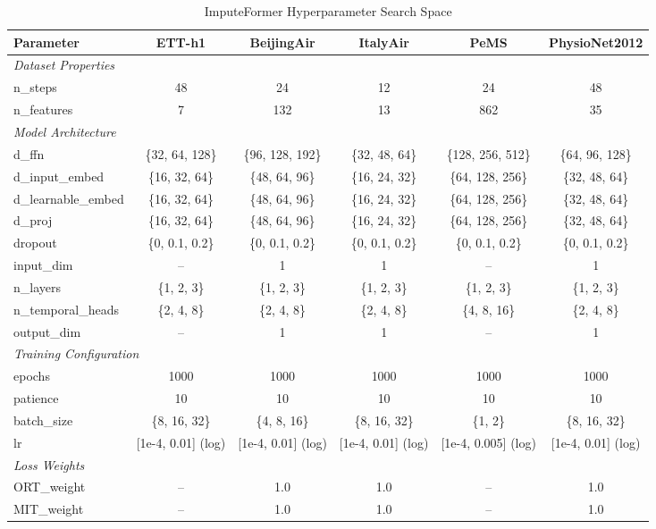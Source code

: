 \begin{table}[H]
\centering
\caption{ImputeFormer Hyperparameter Search Space}
\label{tab:hyperparam_imputeformer}
\begin{adjustbox}{max width=\textwidth}
\begin{small}
\begin{tabular}{l|ccccc}
\toprule
\textbf{Parameter} & \textbf{ETT-h1} & \textbf{BeijingAir} & \textbf{ItalyAir} & \textbf{PeMS} & \textbf{PhysioNet2012} \\
\midrule
\multicolumn{6}{l}{\textit{Dataset Properties}} \\
n\_steps & 48 & 24 & 12 & 24 & 48 \\
n\_features & 7 & 132 & 13 & 862 & 35 \\
\midrule
\multicolumn{6}{l}{\textit{Model Architecture}} \\
d\_ffn & \{32, 64, 128\} & \{96, 128, 192\} & \{32, 48, 64\} & \{128, 256, 512\} & \{64, 96, 128\} \\
d\_input\_embed & \{16, 32, 64\} & \{48, 64, 96\} & \{16, 24, 32\} & \{64, 128, 256\} & \{32, 48, 64\} \\
d\_learnable\_embed & \{16, 32, 64\} & \{48, 64, 96\} & \{16, 24, 32\} & \{64, 128, 256\} & \{32, 48, 64\} \\
d\_proj & \{16, 32, 64\} & \{48, 64, 96\} & \{16, 24, 32\} & \{64, 128, 256\} & \{32, 48, 64\} \\
dropout & \{0, 0.1, 0.2\} & \{0, 0.1, 0.2\} & \{0, 0.1, 0.2\} & \{0, 0.1, 0.2\} & \{0, 0.1, 0.2\} \\
input\_dim & -- & 1 & 1 & -- & 1 \\
n\_layers & \{1, 2, 3\} & \{1, 2, 3\} & \{1, 2, 3\} & \{1, 2, 3\} & \{1, 2, 3\} \\
n\_temporal\_heads & \{2, 4, 8\} & \{2, 4, 8\} & \{2, 4, 8\} & \{4, 8, 16\} & \{2, 4, 8\} \\
output\_dim & -- & 1 & 1 & -- & 1 \\
\midrule
\multicolumn{6}{l}{\textit{Training Configuration}} \\
epochs & 1000 & 1000 & 1000 & 1000 & 1000 \\
patience & 10 & 10 & 10 & 10 & 10 \\
batch\_size & \{8, 16, 32\} & \{4, 8, 16\} & \{8, 16, 32\} & \{1, 2\} & \{8, 16, 32\} \\
lr & [1e-4, 0.01] (log) & [1e-4, 0.01] (log) & [1e-4, 0.01] (log) & [1e-4, 0.005] (log) & [1e-4, 0.01] (log) \\
\midrule
\multicolumn{6}{l}{\textit{Loss Weights}} \\
ORT\_weight & -- & 1.0 & 1.0 & -- & 1.0 \\
MIT\_weight & -- & 1.0 & 1.0 & -- & 1.0 \\
\bottomrule
\end{tabular}
\end{small}
\end{adjustbox}
\end{table}